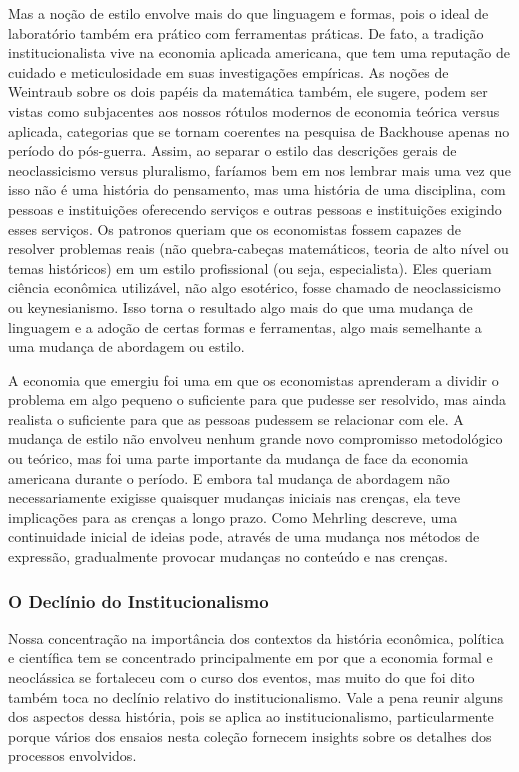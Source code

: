 \documentclass[12pt]{article}
\begin{document}
Mas a noção de estilo envolve mais do que linguagem e formas, pois o ideal de laboratório também era prático com ferramentas práticas. De fato, a tradição institucionalista vive na economia aplicada americana, que tem uma reputação de cuidado e meticulosidade em suas investigações empíricas. As noções de Weintraub sobre os dois papéis da matemática também, ele sugere, podem ser vistas como subjacentes aos nossos rótulos modernos de economia teórica versus aplicada, categorias que se tornam coerentes na pesquisa de Backhouse apenas no período do pós-guerra. Assim, ao separar o estilo das descrições gerais de neoclassicismo versus pluralismo, faríamos bem em nos lembrar mais uma vez que isso não é uma história do pensamento, mas uma história de uma disciplina, com pessoas e instituições oferecendo serviços e outras pessoas e instituições exigindo esses serviços. Os patronos queriam que os economistas fossem capazes de resolver problemas reais (não quebra-cabeças matemáticos, teoria de alto nível ou temas históricos) em um estilo profissional (ou seja, especialista). Eles queriam ciência econômica utilizável, não algo esotérico, fosse chamado de neoclassicismo ou keynesianismo. Isso torna o resultado algo mais do que uma mudança de linguagem e a adoção de certas formas e ferramentas, algo mais semelhante a uma mudança de abordagem ou estilo.

A economia que emergiu foi uma em que os economistas aprenderam a dividir o problema em algo pequeno o suficiente para que pudesse ser resolvido, mas ainda realista o suficiente para que as pessoas pudessem se relacionar com ele. A mudança de estilo não envolveu nenhum grande novo compromisso metodológico ou teórico, mas foi uma parte importante da mudança de face da economia americana durante o período. E embora tal mudança de abordagem não necessariamente exigisse quaisquer mudanças iniciais nas crenças, ela teve implicações para as crenças a longo prazo. Como Mehrling descreve, uma continuidade inicial de ideias pode, através de uma mudança nos métodos de expressão, gradualmente provocar mudanças no conteúdo e nas crenças.

\subsubsection{\textbf{O Declínio do Institucionalismo}}

Nossa concentração na importância dos contextos da história econômica, política e científica tem se concentrado principalmente em por que a economia formal e neoclássica se fortaleceu com o curso dos eventos, mas muito do que foi dito também toca no declínio relativo do institucionalismo. Vale a pena reunir alguns dos aspectos dessa história, pois se aplica ao institucionalismo, particularmente porque vários dos ensaios nesta coleção fornecem insights sobre os detalhes dos processos envolvidos.
\end{document}
